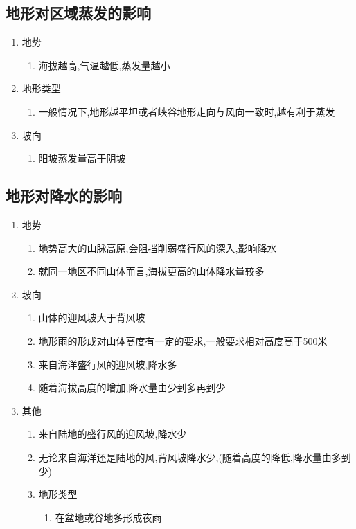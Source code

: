 \documentclass[a4paper]{article}
\begin{document}
    \subsection{地形对区域蒸发的影响}
    \begin{enumerate}
        \item 地势
        \begin{enumerate}
            \item 海拔越高,气温越低,蒸发量越小
        \end{enumerate}
        \item 地形类型
        \begin{enumerate}
            \item 一般情况下,地形越平坦或者峡谷地形走向与风向一致时,越有利于蒸发
        \end{enumerate}
        \item 坡向
        \begin{enumerate}
            \item 阳坡蒸发量高于阴坡
        \end{enumerate}
    \end{enumerate}
    \subsection{地形对降水的影响}
    \begin{enumerate}
        \item 地势
        \begin{enumerate}
            \item 地势高大的山脉高原,会阻挡削弱盛行风的深入,影响降水
            \item 就同一地区不同山体而言,海拔更高的山体降水量较多
        \end{enumerate}
        \item 坡向
        \begin{enumerate}
            \item 山体的迎风坡大于背风坡
            \item 地形雨的形成对山体高度有一定的要求,一般要求相对高度高于500米
            \item 来自海洋盛行风的迎风坡,降水多
            \item 随着海拔高度的增加,降水量由少到多再到少
        \end{enumerate}
        \item 其他
        \begin{enumerate}
            \item 来自陆地的盛行风的迎风坡,降水少
            \item 无论来自海洋还是陆地的风,背风坡降水少,(随着高度的降低,降水量由多到少)
            \item 地形类型
            \begin{enumerate}
                \item 在盆地或谷地多形成夜雨
            \end{enumerate}
        \end{enumerate}
    \end{enumerate}
\end{document}

